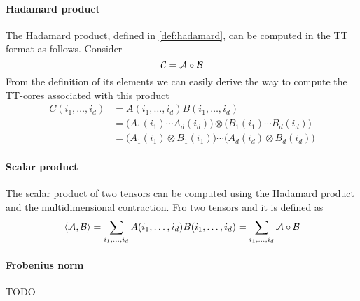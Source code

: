 \paragraph{Hadamard product} The Hadamard product, defined in \ref{def:hadamard}, can be computed in the TT format as follows. Consider
\begin{equation*}
  \mathcal{C} = \mathcal{A} \circ \mathcal{B}
\end{equation*}
From the definition of its elements we can easily derive the way to compute the TT-cores associated with this product
\begin{equation*}
  \begin{split}
    C(i_1,\ldots,i_d) &= A(i_1,\ldots,i_d) B(i_1,\ldots,i_d)\\
    &= \Big( A_1(i_1) \cdots A_d(i_d) \Big) \otimes \Big( B_1(i_1) \cdots B_d(i_d) \Big) \\
    &= \Big( A_1(i_1) \otimes B_1(i_1) \Big) \cdots \Big( A_d(i_d) \otimes B_d(i_d) \Big)
  \end{split}
\end{equation*}

\paragraph{Scalar product}
The scalar product of two tensors can be computed using the Hadamard product and the multidimensional contraction. Fro two tensors \A and \B it is defined as
\begin{equation*}
  \langle \mathcal{A}, \mathcal{B} \rangle = \sum_{i_1,\ldots,i_d} A(i_1,\ldots,i_d)B(i_1,\ldots,i_d) = \sum_{i_1,\ldots,i_d} \mathcal{A} \circ \mathcal{B}
\end{equation*}

\paragraph{Frobenius norm}
TODO

